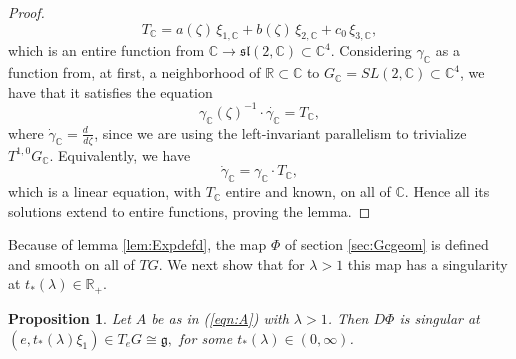 \documentclass[12pt,reqno]{amsart}\usepackage{amssymb,amsmath,amscd,epsfig,amsthm,enumerate,import,eufrak}
\newtheorem{proposition}[theorem]{Proposition}
\theoremstyle{definition}
\theoremstyle{remark}
\numberwithin{equation}{section}
\theoremstyle{plain}
\theoremstyle{definition}
\def \r {\mathbb{R}}
\def \c {\mathbb{C}}
\def \mfg {\mathfrak{g}}
\def \vs {\vskip 2mm}
\theoremstyle{remark}
\numberwithin{theorem}{section}
\begin{document}
\begin{proof}
%
\[
	T_{\c} = a(\zeta) \, \xi_{1,\c} +b(\zeta) \, \xi_{2,\c} + c_0 \, \xi_{3,\c},
\] 
%
which is an entire function from $\c \to \mathfrak{sl}(2,\c) \subset \c^4.$ Considering $\gamma_{\c}$ as a function from, at first, a neighborhood of $\r \subset \c$ to $G_{\c} = SL(2,\c) \subset \c^4$, we have that it satisfies the equation 
%
\[
	\gamma_{\c}(\zeta)^{-1} \cdot \dot{\gamma_{\c}} = T_{\c},
\]
%
where $\dot{\gamma}_{\c} = \frac{d\;\;}{d \zeta}$, since we are using the left-invariant parallelism to trivialize $T^{1,0}G_{\c}$. Equivalently, we have
%
\[
	  \dot{\gamma}_{\c} = \gamma_{\c} \cdot T_{\c},
	 \]
which is a linear equation, with $T_{\c}$ entire and known, on all of $\c$. Hence all its solutions extend to entire functions, proving the lemma.
\end{proof}
%
%
%
\vs
%
%
Because of lemma \ref{lem:Expdefd}, the map $\Phi$ of section \ref{sec:Gcgeom} is defined and smooth on all of $TG$. We next show that for $\lambda> 1$ this map has a singularity at 
$t_*(\lambda) \in \r_+.$
%
%
%
\vs
%
%
%
\begin{proposition}\label{prop:focus}
	Let $A$ be as in (\ref{eqn:A}) with $\lambda> 1$. Then $D\Phi$ is singular at $(e, t_*(\lambda) \xi_1) \in T_eG \cong \mfg,$ for some $t_*(\lambda) \in (0,\infty)$.	
\end{proposition}
%
%
%
%
%
\end{document}
